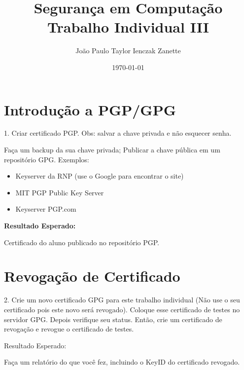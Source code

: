 \documentclass{article}
\title{%
    Segurança em Computação \\
    Trabalho Individual III
}
\author{João Paulo Taylor Ienczak Zanette}
\date{\today}
\newcommand{\done}{%
    \rlap{$\square$}{%
        \raisebox{2pt}{\large\hspace{1pt}\ding{51}
    }}\hspace{-2.5pt}
}
\begin{document}
    \maketitle{}

    \section{Introdução a PGP/GPG}

    \begin{superframe}
        1. Criar certificado PGP\@.
        Obs: salvar a chave privada e não esquecer senha.


        Faça um backup da sua chave privada;
        Publicar a chave pública em um repositório GPG\@. Exemplos:
        \begin{itemize}
            \item Keyserver da RNP (use o Google para encontrar o site)
            \item MIT PGP Public Key Server
            \item Keyserver PGP.com
        \end{itemize}

        \textbf{Resultado Esperado:}

        \begin{todolist}
            \item[\done] Certificado do aluno publicado no repositório PGP\@.
        \end{todolist}
    \end{superframe}

    \section{Revogação de Certificado}

    \begin{superframe}
        2. Crie um novo certificado GPG para este trabalho individual (Não use
        o seu certificado pois este novo será revogado). Coloque esse
        certificado de testes no servidor GPG\@. Depois verifique seu status.
        Então, crie um certificado de revogação e revogue o certificado de
        testes.

        Resultado Esperado:

        \begin{todolist}
            \item[\done] Faça um relatório do que você fez, incluindo o KeyID
                do certificado revogado.
        \end{todolist}
    \end{superframe}
\end{document}
